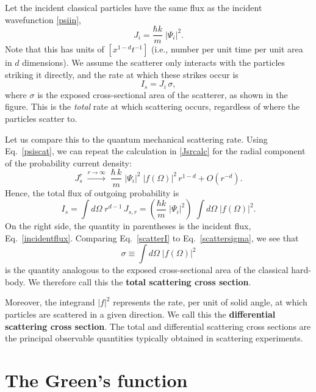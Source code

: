 \documentclass[pra,12pt]{revtex4-2}
\begin{document}
\noindent
Let the incident classical particles have the same flux as the
incident wavefunction \eqref{psiin},
\begin{equation}
  J_{i} = \frac{\hbar k}{m} \;|\Psi_i|^2.
  \label{incidentflux}
\end{equation}
Note that this has units of $[x^{1-d}t^{-1}]$ (i.e., number per unit
time per unit area in $d$ dimensions).  We assume the scatterer only
interacts with the particles striking it directly, and the rate at
which these strikes occur is
\begin{equation}
  I_s = J_i \, \sigma,
  \label{scattersigma}
\end{equation}
where $\sigma$ is the exposed cross-sectional area of the scatterer,
as shown in the figure.  This is the \textit{total} rate at which
scattering occurs, regardless of where the particles scatter to.

Let us compare this to the quantum mechanical scattering rate.  Using
Eq.~\eqref{psiscat}, we can repeat the calculation in \eqref{Jsrcalc}
for the radial component of the probability current density:
\begin{equation}
  J_s^r \; \overset{r\rightarrow\infty}{\longrightarrow}\;
  \frac{\hbar \,k}{m}\; |\Psi_i|^2 \; |f(\Omega)|^2 \,r^{1-d}
  + O(r^{-d}).
\end{equation}
Hence, the total flux of outgoing probability is
\begin{equation}
  I_s = \int d\Omega\; r^{d-1} \, J_{s,r}
  = \left(\frac{\hbar k}{m} \;|\Psi_i|^2\right) \; \int d\Omega\; \big|f(\Omega)\big|^2.
  \label{scatterI}
\end{equation}
On the right side, the quantity in parentheses is the incident flux,
Eq.~\eqref{incidentflux}.  Comparing Eq.~\eqref{scatterI} to
Eq.~\eqref{scattersigma}, we see that
\begin{equation*}
  \sigma \equiv \int d\Omega \; \big|f(\Omega)\big|^2
\end{equation*}
is the quantity analogous to the exposed cross-sectional area of the
classical hard-body.  We therefore call this the \textbf{total
  scattering cross section}.

Moreover, the integrand $|f|^2$ represents the rate, per unit of solid
angle, at which particles are scattered in a given direction.  We call
this the \textbf{differential scattering cross section}.  The total
and differential scattering cross sections are the principal
observable quantities typically obtained in scattering experiments.

\section{The Green's function}
\label{sec:greensfun}
\end{document}
